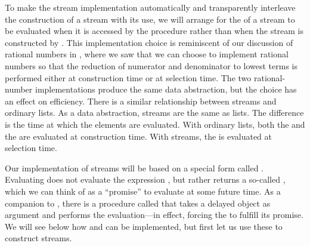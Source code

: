 To make the stream implementation automatically and transparently interleave the construction of a stream with its use, we will arrange for the  of a stream to be evaluated when it is accessed by the  procedure rather than when the stream is constructed by .
This implementation choice is reminiscent of our discussion of rational numbers in , where we saw that we can choose to implement rational numbers so that the reduction of numerator and denominator to lowest terms is performed either at construction time or at selection time.
The two rational-number implementations produce the same data abstraction, but the choice has an effect on efficiency.
There is a similar relationship between streams and ordinary lists.
As a data abstraction, streams are the same as lists.
The difference is the time at which the elements are evaluated.
With ordinary lists, both the  and the  are evaluated at construction time.
With streams, the  is evaluated at selection time.

Our implementation of streams will be based on a special form called .
Evaluating  does not evaluate the expression , but rather returns a so-called , which we can think of as a “promise” to evaluate  at some future time.
As a companion to , there is a procedure called  that takes a delayed object as argument and performs the evaluation---in effect, forcing the  to fulfill its promise.
We will see below how  and  can be implemented, but first let us use these to construct streams.


